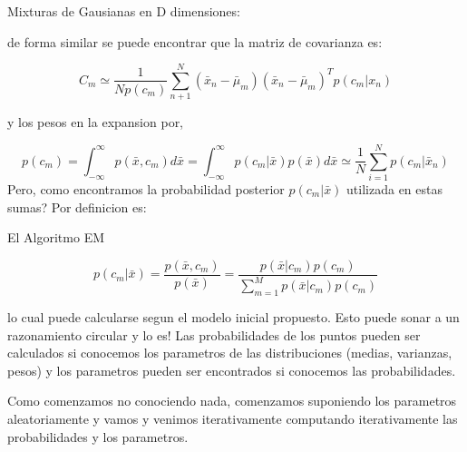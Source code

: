 \documentclass[ignorenonframetext,]{beamer}
\begin{document}
\begin{frame}

\begin{block}{Mixturas de Gausianas en D dimensiones:}

de forma similar se puede encontrar que la matriz de covarianza es:

\[ C_{m} \simeq \frac{1}{N p(c_{m})} \sum_{n+1}^{N} (\bar{x}_{n}-\bar{\mu}_{m})(\bar{x}_{n}-\bar{\mu}_{m})^{T} p(c_{m}| x_{n})\]

y los pesos en la expansion por,

\[ p(c_{m})=\int_{-\infty}^{\infty} p(\bar{x}, c_{m}) d\bar{x}= \int_{-\infty}^{\infty} p(c_{m} | \bar{x}) p(\bar{x}) d{\bar{x}} \simeq \frac{1}{N} \sum_{i=1}^{N} p(c_{m} | \bar{x}_{n})\]
Pero, como encontramos la probabilidad posterior \(p(c_{m}|\bar{x})\)
utilizada en estas sumas? Por definicion es:

\end{block}

\end{frame}

\begin{frame}

\begin{block}{El Algoritmo EM}

\[ p(c_{m}| \bar{x})=\frac{p(\bar{x}, c_{m})}{p(\bar{x})}=\frac{p(\bar{x}| c_{m})p(c_{m})}{\sum_{m=1}^{M} p(\bar{x}|c_{m})p(c_{m})}
\]

lo cual puede calcularse segun el modelo inicial propuesto. Esto puede
sonar a un razonamiento circular y lo es! Las probabilidades de los
puntos pueden ser calculados si conocemos los parametros de las
distribuciones (medias, varianzas, pesos) y los parametros pueden ser
encontrados si conocemos las probabilidades.

Como comenzamos no conociendo nada, comenzamos suponiendo los parametros
aleatoriamente y vamos y venimos iterativamente computando
iterativamente las probabilidades y los parametros.

\end{block}

\end{frame}
\end{document}
